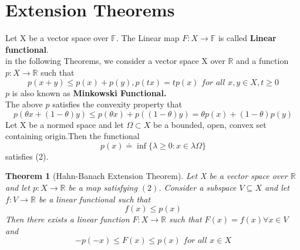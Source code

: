 \documentclass{article}
\newtheorem{theorem}{Theorem}[section]
\begin{document}
\section{Extension Theorems}
Let X be a vector space over $\mathbb{F} $. The Linear map $F : X \to \mathbb{F} $ is called \textbf{Linear functional}.
\\ in the following Theorems, we consider a vector space X over $\mathbb{R} $ and a function $p:X \to \mathbb{R} $ such that 
\begin{equation}
    p(x+y)\leq p(x)+p(y) , p(tx)=tp(x) \textit{  for all  } x,y\in X, t \geq 0
\end{equation}
$p$ is also known as \textbf{Minkowski Functional.} \\

The above $p$ satisfies the convexity property that $$p(\theta x+(1-\theta)y)\leq p(\theta x) +p((1-\theta)y)= \theta p(x)+(1-\theta)p(y)$$
Let X be a normed space and let $\Omega \subset X$ be a bounded, open, convex set containing origin.Then the functional
\begin{equation}
    p(x)\doteq \inf \{\lambda \geq 0: x \in\lambda \Omega\}
\end{equation}
satisfies (2).
\begin{theorem}[Hahn-Banach Extension Theorem]
 Let X be a vector space over $\mathbb{R} $  and let $p:X \to \mathbb{R} $ be a map satisfying $(2)$. Consider a subspace $ V \subseteq X$ and let $f:V\to \mathbb{R} $ be a linear functional such that $$f(x)\leq p(x)$$ Then there exists a linear function $F: X \to \mathbb{R} $ such that $F(x)=f(x) \forall x \in V$ and $$-p(-x)\leq F(x)\leq p(x) \textit{        for all x$\in X$}$$    
\end{theorem}
\end{document}
